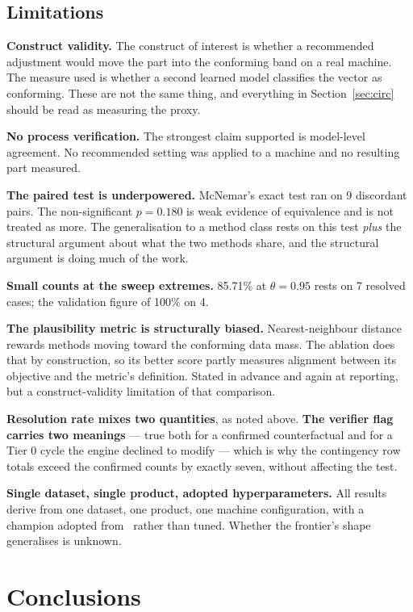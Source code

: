 \documentclass[11pt,a4paper]{article}
\begin{document}
\subsection{Limitations}

\textbf{Construct validity.} The construct of interest is whether a recommended adjustment would move the part into the conforming band on a real machine. The measure used is whether a second learned model classifies the vector as conforming. These are not the same thing, and everything in Section~\ref{sec:circ} should be read as measuring the proxy.

\textbf{No process verification.} The strongest claim supported is model-level agreement. No recommended setting was applied to a machine and no resulting part measured.

\textbf{The paired test is underpowered.} McNemar's exact test ran on 9 discordant pairs. The non-significant $p = 0.180$ is weak evidence of equivalence and is not treated as more. The generalisation to a method class rests on this test \emph{plus} the structural argument about what the two methods share, and the structural argument is doing much of the work.

\textbf{Small counts at the sweep extremes.} 85.71\% at $\theta = 0.95$ rests on 7 resolved cases; the validation figure of 100\% on 4.

\textbf{The plausibility metric is structurally biased.} Nearest-neighbour distance rewards methods moving toward the conforming data mass. The ablation does that by construction, so its better score partly measures alignment between its objective and the metric's definition. Stated in advance and again at reporting, but a construct-validity limitation of that comparison.

\textbf{Resolution rate mixes two quantities}, as noted above. \textbf{The verifier flag carries two meanings} --- true both for a confirmed counterfactual and for a Tier 0 cycle the engine declined to modify --- which is why the contingency row totals exceed the confirmed counts by exactly seven, without affecting the test.

\textbf{Single dataset, single product, adopted hyperparameters.} All results derive from one dataset, one product, one machine configuration, with a champion adopted from~\cite{polenta2022} rather than tuned. Whether the frontier's shape generalises is unknown.

\section{Conclusions}
\end{document}

